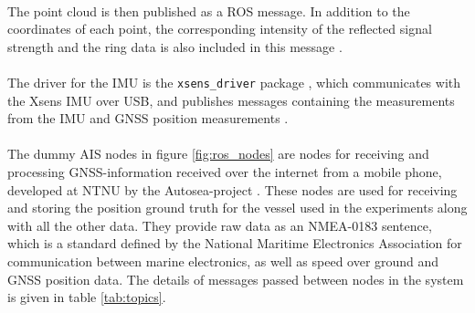 \vspace{2mm}\\
\noindent The point cloud is then published as a ROS message. In addition to the coordinates of each point, the corresponding intensity of the reflected signal strength and the ring data is also included in this message \cite{velodyne_driver}.\\
\vspace{2mm}\\
\noindent The driver for the IMU is the \lstinline[basicstyle=\ttfamily]{xsens_driver} package \cite{xsens_driver}, which communicates with the Xsens IMU over USB, and publishes messages containing the measurements from the IMU and GNSS position measurements \cite{xsens_driver}.\\
\vspace{2mm}\\
\noindent The dummy AIS nodes in figure \ref{fig:ros_nodes} are nodes for receiving and processing GNSS-information received over the internet from a mobile phone, developed at NTNU by the Autosea-project . These nodes are used for receiving and storing the position ground truth for the vessel used in the experiments along with all the other data. They provide raw data as an NMEA-0183 sentence, which is a standard defined by the National Maritime Electronics Association for communication between marine electronics, as well as speed over ground and GNSS position data.
The details of messages passed between nodes in the system is given in table \ref{tab:topics}.

